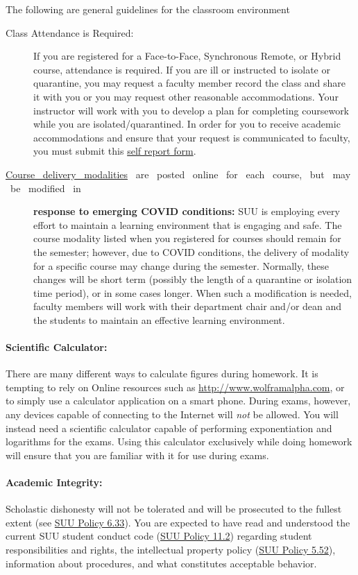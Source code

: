 \documentclass[12pt, letterpaper]{article}
\begin{document}
\noindent The following are general guidelines for the classroom environment
\begin{description}
	\item[Class Attendance is Required:] If you are registered for a Face-to-Face, Synchronous Remote, or Hybrid course, attendance is required. If you are ill or instructed to isolate or quarantine, you may request a faculty member record the class and share it with you or you may request other reasonable accommodations. Your instructor will work with you to develop a plan for completing coursework while you are isolated/quarantined. In order for you to receive academic accommodations and ensure that your request is communicated to faculty, you must submit this \href{https://my.suu.edu/covid/selfreport/}{self report form}.
	\item[\href{https://www.suu.edu/registrar/onlinehybrid.html}{Course ~delivery ~modalities} ~are ~posted ~online ~for ~each ~course, ~but ~may ~be ~modified ~in] \textbf{response to emerging COVID conditions:} SUU is employing every effort to maintain a learning environment that is engaging and safe. The course modality listed when you registered for courses should remain for the semester; however, due to COVID conditions, the delivery of modality for a specific course may change during the semester. Normally, these changes will be short term (possibly the length of a quarantine or isolation time period), or in some cases longer. When such a modification is needed, faculty members will work with their department chair and/or dean and the students to maintain an effective learning environment.
\end{description}

\paragraph{Scientific Calculator:}
There are many different ways to calculate figures during homework. It is tempting to rely on Online resources such as \href{http://www.wolframalpha.com}{http://www.wolframalpha.com}, or to simply use a calculator application on a smart phone. During exams, however, any devices capable of connecting to the Internet will \emph{not} be allowed. You will instead need a scientific calculator capable of performing exponentiation and logarithms for the exams. Using this calculator exclusively while doing homework will ensure that you are familiar with it for use during exams.

\paragraph{Academic Integrity:}
Scholastic dishonesty will not be tolerated and will be prosecuted to the fullest extent (see \href{https://www.suu.edu/policies/06/33.html}{SUU Policy 6.33}). You are expected to have read and understood the current SUU student conduct code (\href{https://www.suu.edu/policies/11/02.html}{SUU Policy 11.2}) regarding student responsibilities and rights, the intellectual property policy (\href{https://www.suu.edu/policies/05/52.html}{SUU Policy 5.52}), information about procedures, and what constitutes acceptable behavior.
\end{document}
